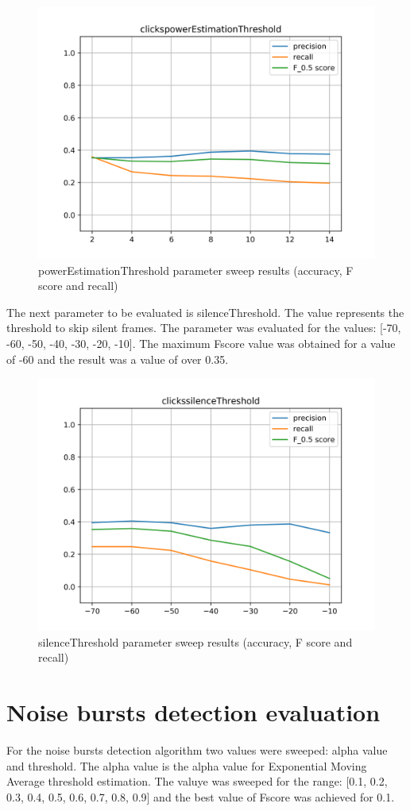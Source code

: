 \begin{figure}[H]
	\includegraphics[clip,width=0.7\columnwidth]{Figures/clickspowerEstimationThreshold.png}%
	\caption{powerEstimationThreshold parameter sweep results (accuracy, F score and recall)}
	\label{fig:clickspowerEstimationThreshold}
\end{figure}

The next parameter to be evaluated is silenceThreshold. The value represents the threshold to skip silent frames. The parameter was evaluated for the values: [-70, -60, -50, -40, -30, -20, -10]. The maximum Fscore value was obtained for a value of -60 and the result was a value of over 0.35.

\begin{figure}[H]
	\includegraphics[clip,width=0.7\columnwidth]{Figures/clickssilenceThreshold.png}%
	\caption{silenceThreshold parameter sweep results (accuracy, F score and recall)}
	\label{fig:clickssilenceThreshold}
\end{figure}

\section{Noise bursts detection evaluation}
For the noise bursts detection algorithm two values were sweeped: alpha value and threshold. The alpha value is the alpha value for Exponential Moving Average threshold estimation. The valuye was sweeped for the range: [0.1, 0.2, 0.3, 0.4, 0.5, 0.6, 0.7, 0.8, 0.9] and the best value of Fscore was achieved for 0.1.


